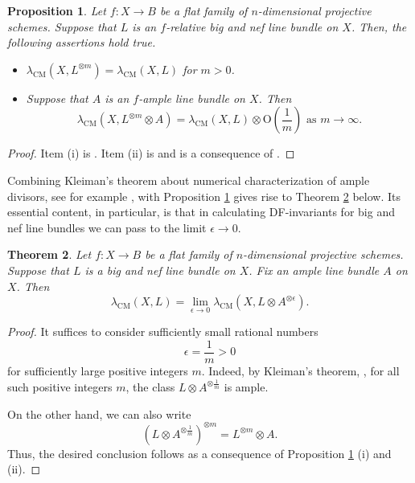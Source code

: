 \documentclass[12pt]{amsart}
\newtheorem{theorem}{Theorem}[section]
\newtheorem{proposition}[theorem]{Proposition}
\theoremstyle{definition}
\numberwithin{equation}{section}
\begin{document}
\begin{proposition}\label{CM:line:bundle:first:properties}
Let $f \colon X \rightarrow B$ be a flat family of $n$-dimensional projective schemes.  Suppose that $L$ is an $f$-relative big and nef line bundle on $X$.   Then, the following assertions hold true.
\begin{itemize}
\item[(i)]{
$\lambda_{\mathrm{CM}}(X,L^{\otimes m}) = \lambda_{\mathrm{CM}}(X,L)$ for $m > 0$.
}
\item[(ii)]{
Suppose that $A$ is an $f$-ample line bundle on $X$.  Then
$$
\lambda_{\mathrm{CM}}(X,L^{\otimes m} \otimes A) = \lambda_{\mathrm{CM}}(X,L) \otimes \mathrm{O} \left( \frac{1}{m} \right) \text{ as $m \to \infty$.}
$$
}
\end{itemize}
\end{proposition}
\begin{proof}
Item (i) is \cite[Proposition 2.7 (1)]{Arezzo:DellaVedova:LaNave}.  Item (ii) is \cite[Proposition 2.8]{Arezzo:DellaVedova:LaNave} and is a consequence of \cite[Proposition 2.7 (1) \& (2)]{Arezzo:DellaVedova:LaNave}.
\end{proof}


Combining Kleiman's theorem about numerical characterization of ample divisors, see for example \cite[Corollary 1.4.10]{Laz}, with Proposition \ref{CM:line:bundle:first:properties} gives rise to Theorem \ref{CM:line:bundle:epsilon:zero} below.  Its essential content, in particular, is that in calculating DF-invariants for big and nef line bundles we can pass to the limit $\epsilon \to 0$.  

\begin{theorem}\label{CM:line:bundle:epsilon:zero}
Let $f \colon X \rightarrow B$ be a flat family of $n$-dimensional projective schemes.  Suppose that $L$ is a big and nef line bundle on $X$.  Fix an ample line bundle $A$ on $X$.  Then
$$\lambda_{\mathrm{CM}}(X,L) = \lim\limits_{\epsilon \to 0} \lambda_{\mathrm{CM}}(X,L \otimes A^{\otimes \epsilon})  \text{.} $$
\end{theorem}
\begin{proof}
It suffices to consider sufficiently small rational numbers 
$$\epsilon = \frac{1}{m} > 0$$ 
for sufficiently large positive integers $m$.  Indeed, by Kleiman's theorem, \cite[Corollary 1.4.10]{Laz}, for all such positive integers $m$, the class $L \otimes A^{\otimes \frac{1}{m}}$ is ample.  

On the other hand, we can also write 
$$\left(L \otimes A^{\otimes \frac{1}{m}} \right)^{\otimes m} = L^{\otimes m} \otimes A \text{.}$$  
Thus, the desired conclusion follows as a consequence of Proposition \ref{CM:line:bundle:first:properties} (i) and (ii).
\end{proof}
\end{document}
